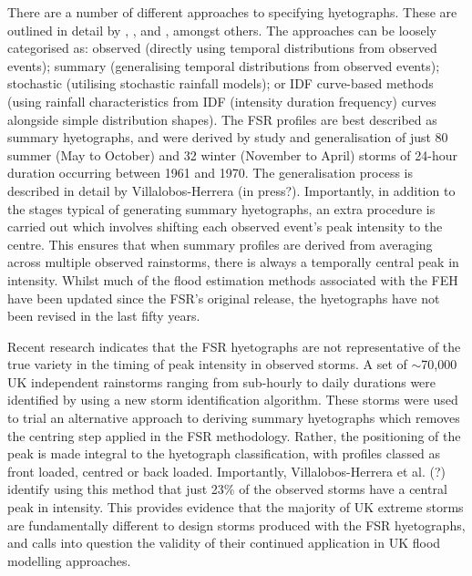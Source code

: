 \documentclass[APA,Times2COL]{WileyNJDv5}
\begin{document}
There are a number of different approaches to specifying hyetographs. These are outlined in detail by \citet{chow1988applied}, \citet{veneziano1999best}, and \citet{balbastre2019comparison}, amongst others. The approaches can be loosely categorised as: observed (directly using temporal distributions from observed events); summary (generalising temporal distributions from observed events); stochastic (utilising stochastic rainfall models); or IDF curve-based methods (using rainfall characteristics from IDF (intensity duration frequency) curves alongside simple distribution shapes). The FSR profiles are best described as summary hyetographs, and were derived by study and generalisation of just 80 summer (May to October) and 32 winter (November to April) storms of 24-hour duration occurring between 1961 and 1970. The generalisation process is described in detail by Villalobos-Herrera (in press?). Importantly, in addition to the stages typical of generating summary hyetographs, an extra procedure is carried out which involves shifting each observed event's peak intensity to the centre. This ensures that when summary profiles are derived from averaging across multiple observed rainstorms, there is always a temporally central peak in intensity. Whilst much of the flood estimation methods associated with the FEH have been updated since the FSR's original release, the hyetographs have not been revised in the last fifty years. 


Recent research indicates that the FSR hyetographs are not representative of the true variety in the timing of peak intensity in observed storms. A set of $\sim$70,000 UK independent rainstorms ranging from sub-hourly to daily durations were identified by \citet{herrera2023creation} using a new storm identification algorithm. These storms were used to trial an alternative approach to deriving summary hyetographs which removes the centring step applied in the FSR methodology. Rather, the positioning of the peak is made integral to the hyetograph classification, with profiles classed as front loaded, centred or back loaded. Importantly, Villalobos-Herrera et al. (?) identify using this method that just 23\% of the observed storms have a central peak in intensity. This provides evidence that the majority of UK extreme storms are fundamentally different to design storms produced with the FSR hyetographs, and calls into question the validity of their continued application in UK flood modelling approaches. 
\end{document}
